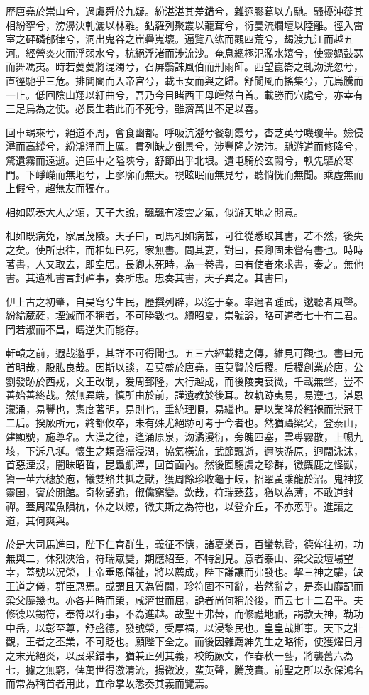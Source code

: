 歷唐堯於崇山兮，過虞舜於九疑。紛湛湛其差錯兮，雜遝膠葛以方馳。騷擾沖蓯其相紛挐兮，滂濞泱軋灑以林離。鉆羅列聚叢以蘢茸兮，衍曼流爛壇以陸離。徑入雷室之砰磷郁律兮，洞出鬼谷之崫礨嵬壞。遍覽八纮而觀四荒兮，朅渡九江而越五河。經營炎火而浮弱水兮，杭絕浮渚而涉流沙。奄息總極氾濫水嬉兮，使靈媧鼓瑟而舞馮夷。時若薆薆將混濁兮，召屏翳誅風伯而刑雨師。西望崑崙之軋沕洸忽兮，直徑馳乎三危。排閶闔而入帝宮兮，載玉女而與之歸。舒閬風而搖集兮，亢烏騰而一止。低回陰山翔以紆曲兮，吾乃今目睹西王母皬然白首。載勝而穴處兮，亦幸有三足烏為之使。必長生若此而不死兮，雖濟萬世不足以喜。

回車朅來兮，絕道不周，會食幽都。呼吸沆瀣兮餐朝霞兮，杳芝英兮嘰瓊華。嬐侵潯而高縱兮，紛鴻涌而上厲。貫列缺之倒景兮，涉豐隆之滂沛。馳游道而修降兮，騖遺霧而遠逝。迫區中之隘陝兮，舒節出乎北垠。遺屯騎於玄闕兮，軼先驅於寒門。下崢嶸而無地兮，上寥廓而無天。視眩眠而無見兮，聽惝恍而無聞。乘虛無而上假兮，超無友而獨存。

相如既奏大人之頌，天子大說，飄飄有凌雲之氣，似游天地之閒意。

相如既病免，家居茂陵。天子曰，司馬相如病甚，可往從悉取其書，若不然，後失之矣。使所忠往，而相如已死，家無書。問其妻，對曰，長卿固未嘗有書也。時時著書，人又取去，即空居。長卿未死時，為一卷書，曰有使者來求書，奏之。無他書。其遺札書言封禪事，奏所忠。忠奏其書，天子異之。其書曰，

伊上古之初肇，自昊穹兮生民，歷撰列辟，以迄于秦。率邇者踵武，逖聽者風聲。紛綸葳蕤，堙滅而不稱者，不可勝數也。續昭夏，崇號謚，略可道者七十有二君。罔若淑而不昌，疇逆失而能存。

軒轅之前，遐哉邈乎，其詳不可得聞也。五三六經載籍之傳，維見可觀也。書曰元首明哉，股肱良哉。因斯以談，君莫盛於唐堯，臣莫賢於后稷。后稷創業於唐，公劉發跡於西戎，文王改制，爰周郅隆，大行越成，而後陵夷衰微，千載無聲，豈不善始善終哉。然無異端，慎所由於前，謹遺教於後耳。故軌跡夷易，易遵也，湛恩濛涌，易豐也，憲度著明，易則也，垂統理順，易繼也。是以業隆於繦褓而崇冠于二后。揆厥所元，終都攸卒，未有殊尤絕跡可考于今者也。然猶躡梁父，登泰山，建顯號，施尊名。大漢之德，逢涌原泉，沕潏漫衍，旁魄四塞，雲尃霧散，上暢九垓，下泝八埏。懷生之類霑濡浸潤，協氣橫流，武節飄逝，邇陜游原，迥闊泳沫，首惡湮沒，闇昧昭晢，昆蟲凱澤，回首面內。然後囿騶虞之珍群，徼麋鹿之怪獸，噵一莖六穗於庖，犧雙觡共抵之獸，獲周餘珍收龜于岐，招翠黃乘龍於沼。鬼神接靈圉，賓於閒館。奇物譎詭，俶儻窮變。欽哉，符瑞臻茲，猶以為薄，不敢道封禪。蓋周躍魚隕杭，休之以燎，微夫斯之為符也，以登介丘，不亦恧乎。進讓之道，其何爽與。

於是大司馬進曰，陛下仁育群生，義征不憓，諸夏樂貢，百蠻執贄，德侔往初，功無與二，休烈浹洽，符瑞眾變，期應紹至，不特創見。意者泰山、梁父設壇場望幸，蓋號以況榮，上帝垂恩儲祉，將以薦成，陛下謙讓而弗發也。挈三神之驩，缺王道之儀，群臣恧焉。或謂且天為質闇，珍符固不可辭，若然辭之，是泰山靡記而梁父靡幾也。亦各并時而榮，咸濟世而屈，說者尚何稱於後，而云七十二君乎。夫修德以錫符，奉符以行事，不為進越。故聖王弗替，而修禮地祇，謁款天神，勒功中岳，以彰至尊，舒盛德，發號榮，受厚福，以浸黎民也。皇皇哉斯事。天下之壯觀，王者之丕業，不可貶也。願陛下全之。而後因雜薦紳先生之略術，使獲燿日月之末光絕炎，以展采錯事，猶兼正列其義，校飭厥文，作春秋一藝，將襲舊六為七，攄之無窮，俾萬世得激清流，揚微波，蜚英聲，騰茂實。前聖之所以永保鴻名而常為稱首者用此，宜命掌故悉奏其義而覽焉。

